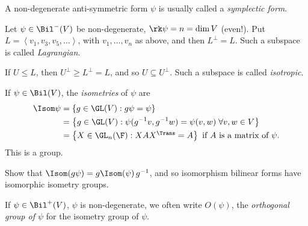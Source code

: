 \begin{remark}
	A non-degenerate anti-symmetric form  $\psi$ is usually called a \emph{symplectic form}.	

	Let $\psi\in\Bil^-(V)$ be non-degenerate, $\rk\psi=n = \dim V$ (even!). Put $L=\left\langle v_1,v_3,v_5,\ldots \right\rangle$, with $v_1,\ldots,v_n$ as above, and then $L^\perp=L$. Such a subspace is called \emph{Lagrangian}. %
	
	If $U\leq L$, then $U^\perp\geq L^\perp = L$, and so $U\subseteq U^\perp$. Such a subspace is called \emph{isotropic}. %
\end{remark}

\begin{definition}
	If $\psi\in\Bil(V)$, the \emph{isometries} of $\psi$ are %
	\begin{align*}
		\Isom\psi
		&= \left\{g\in\GL(V) : g\psi = \psi\right\} \\
		&= \left\{g\in\GL(V): \psi(g^{-1} v, g^{-1} w) = \psi(v,w)\;\forall v,w\in V\right\} \\ %
		&=\left\{X\in\textstyle\GL_n(\F) : XAX^\Trans = A\right\} \text{ if } A \text{ is a matrix of } \psi. %
	\end{align*}
	This is a group. 
\end{definition}

\begin{exercise}
	Show that $\Isom(g\psi) = g \Isom (\psi) \, g^{-1}$, and so isomorphism bilinear forms have isomorphic isometry groups. %
\end{exercise}

If $\psi\in\Bil^+(V)$, $\psi$ is non-degenerate, we often write $O(\psi)$, the \emph{orthogonal group of $\psi$} for the isometry group of $\psi$.

